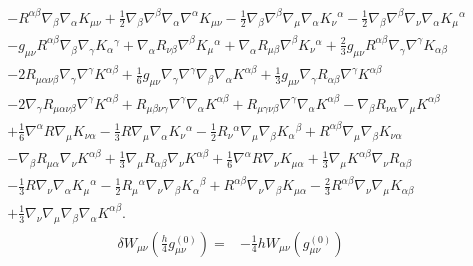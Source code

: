 \documentclass[10pt,letterpaper]{article}
\begin{document}
\begin{align}
& -  R^{\alpha \beta} \nabla_{\beta}\nabla_{\alpha}K_{\mu \nu}
 + \tfrac{1}{2} \nabla_{\beta}\nabla^{\beta}\nabla_{\alpha}\nabla^{\alpha}K_{\mu \nu}
 -  \tfrac{1}{2} \nabla_{\beta}\nabla^{\beta}\nabla_{\mu}\nabla_{\alpha}K_{\nu}{}^{\alpha}
 -  \tfrac{1}{2} \nabla_{\beta}\nabla^{\beta}\nabla_{\nu}\nabla_{\alpha}K_{\mu}{}^{\alpha}\nonumber\\
& -  g_{\mu \nu} R^{\alpha \beta} \nabla_{\beta}\nabla_{\gamma}K_{\alpha}{}^{\gamma}
 + \nabla_{\alpha}R_{\nu \beta} \nabla^{\beta}K_{\mu}{}^{\alpha}
 + \nabla_{\alpha}R_{\mu \beta} \nabla^{\beta}K_{\nu}{}^{\alpha}
 + \tfrac{2}{3} g_{\mu \nu} R^{\alpha \beta} \nabla_{\gamma}\nabla^{\gamma}K_{\alpha \beta}\nonumber\\
& - 2 R_{\mu \alpha \nu \beta} \nabla_{\gamma}\nabla^{\gamma}K^{\alpha \beta}
 + \tfrac{1}{6} g_{\mu \nu} \nabla_{\gamma}\nabla^{\gamma}\nabla_{\beta}\nabla_{\alpha}K^{\alpha \beta}
 + \tfrac{1}{3} g_{\mu \nu} \nabla_{\gamma}R_{\alpha \beta} \nabla^{\gamma}K^{\alpha \beta}\nonumber\\
& - 2 \nabla_{\gamma}R_{\mu \alpha \nu \beta} \nabla^{\gamma}K^{\alpha \beta}
 + R_{\mu \beta \nu \gamma} \nabla^{\gamma}\nabla_{\alpha}K^{\alpha \beta}
 + R_{\mu \gamma \nu \beta} \nabla^{\gamma}\nabla_{\alpha}K^{\alpha \beta}
 -  \nabla_{\beta}R_{\nu \alpha} \nabla_{\mu}K^{\alpha \beta}\nonumber\\
& + \tfrac{1}{6} \nabla^{\alpha}R \nabla_{\mu}K_{\nu \alpha}
 -  \tfrac{1}{3} R \nabla_{\mu}\nabla_{\alpha}K_{\nu}{}^{\alpha}
 -  \tfrac{1}{2} R_{\nu}{}^{\alpha} \nabla_{\mu}\nabla_{\beta}K_{\alpha}{}^{\beta}
 + R^{\alpha \beta} \nabla_{\mu}\nabla_{\beta}K_{\nu \alpha}\nonumber\\
& -  \nabla_{\beta}R_{\mu \alpha} \nabla_{\nu}K^{\alpha \beta}
 + \tfrac{1}{3} \nabla_{\mu}R_{\alpha \beta} \nabla_{\nu}K^{\alpha \beta}
 + \tfrac{1}{6} \nabla^{\alpha}R \nabla_{\nu}K_{\mu \alpha}
 + \tfrac{1}{3} \nabla_{\mu}K^{\alpha \beta} \nabla_{\nu}R_{\alpha \beta}\nonumber\\
& -  \tfrac{1}{3} R \nabla_{\nu}\nabla_{\alpha}K_{\mu}{}^{\alpha}
 -  \tfrac{1}{2} R_{\mu}{}^{\alpha} \nabla_{\nu}\nabla_{\beta}K_{\alpha}{}^{\beta}
 + R^{\alpha \beta} \nabla_{\nu}\nabla_{\beta}K_{\mu \alpha}
 -  \tfrac{2}{3} R^{\alpha \beta} \nabla_{\nu}\nabla_{\mu}K_{\alpha \beta}\nonumber\\
& + \tfrac{1}{3} \nabla_{\nu}\nabla_{\mu}\nabla_{\beta}\nabla_{\alpha}K^{\alpha \beta}.
\end{align}
\begin{align}
\delta W_{\mu\nu}(\tfrac{h}{4}g_{\mu\nu}^{(0)})={}&-\frac14 h W_{\mu\nu}(g_{\mu\nu}^{(0)})
\end{align}
\end{document}
